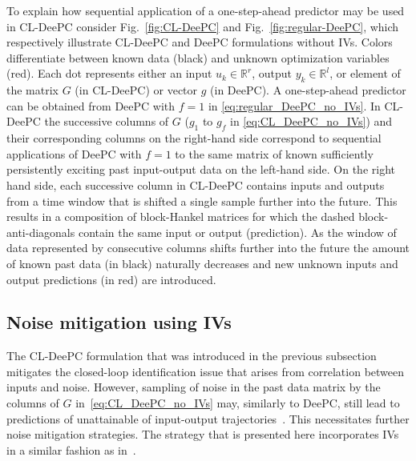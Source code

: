 To explain how sequential application of a one-step-ahead predictor may be used in \ac{CL-DeePC} consider Fig.~\ref{fig:CL-DeePC} and Fig.~\ref{fig:regular-DeePC}, which respectively illustrate \ac{CL-DeePC} and \ac{DeePC} formulations without \ac{IVs}. Colors differentiate between known data (black) and unknown optimization variables (red). Each dot represents either an input ${u_k\in\mathbb{R}^r}$, output ${y_k\in\mathbb{R}^l}$, or element of the matrix $G$ (in \ac{CL-DeePC}) or vector $g$ (in \ac{DeePC}). A one-step-ahead predictor can be obtained from \ac{DeePC} with $f=1$ in \eqref{eq:regular_DeePC_no_IVs}. In \ac{CL-DeePC} the successive columns of $G$ ($g_1$ to $g_f$ in \eqref{eq:CL_DeePC_no_IVs}) and their corresponding columns on the right-hand side correspond to sequential applications of \ac{DeePC} with $f=1$ to the same matrix of known sufficiently persistently exciting past input-output data on the left-hand side. On the right hand side, each successive column in \ac{CL-DeePC} contains inputs and outputs from a time window that is shifted a single sample further into the future. This results in a composition of block-Hankel matrices for which the dashed block-anti-diagonals contain the same input or output (prediction). As the window of data represented by consecutive columns shifts further into the future the amount of known past data (in black) naturally decreases and new unknown inputs and output predictions (in red) are introduced.

%
\subsection{Noise mitigation using \acl{IVs}}
\noindent The \ac{CL-DeePC} formulation that was introduced in the previous subsection mitigates the closed-loop identification issue that arises from correlation between inputs and noise. However, sampling of noise in the past data matrix by the columns of $G$ in~\eqref{eq:CL_DeePC_no_IVs} may, similarly to \ac{DeePC}, still lead to predictions of unattainable of input-output trajectories~\citep{Markovsky2023}. This necessitates further noise mitigation strategies. The strategy that is presented here incorporates \ac{IVs} in a similar fashion as in~\cite{vanWingerden2022}. 

